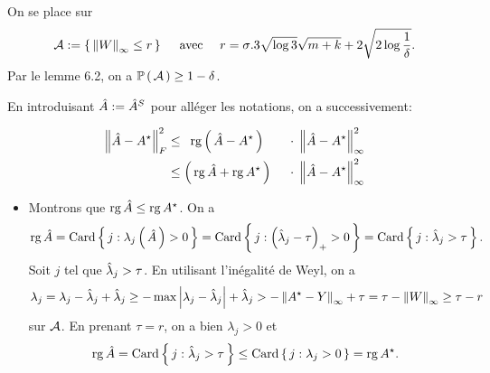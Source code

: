 \setcounter{sol}{1}
\begin{sol}

 On se place sur $$\A := \acc{\norme{W}_{\infty} \leq r} \quad \text{ avec } \quad
  r = \sigma \pt{3 \sqrt{\log 3} \sqrt{m+k} + 2 \sqrt{2
    \log \frac{1}{\delta}}}.$$ Par le lemme 6.2, on a $\displaystyle \mathbb{P} \left( \, \mathcal{A} \, \right)
  \geq 1-\delta$.

 En introduisant $\hat{A} := \hat{A}^S$ pour alléger les notations, on a successivement:

 \begin{alignat}{3}
  \norme{\Aestim - \Aopt}_F^2
   & \leq \enspace \rg \prt{\Aestim - \Aopt}      &\;\cdot
  &\; \norme{\Aestim - \Aopt}_{\infty}^2   \nonumber  \\
   & \leq \prt{\rg \Aestim + \rg \Aopt} \;  &\cdot &\;\norme{\Aestim - \Aopt}_{\infty}^2 \label{eq:rg}
 \end{alignat}
 \begin{itemize}[font= \color{blue} \Large, label= $\bullet$]
  \item Montrons que $\rg \Aestim \leq \rg \Aopt$. On a
        $$\operatorname{rg} \hat{A} = \operatorname{Card} \left \{ \, j : \lambda_j\left( \, \hat{A} \, \right)>0 \, \right \} = \operatorname{Card} \left \{ \, j :
          \left( \hat { \lambda } _ { j } - \tau \right) _ { + }>0 \, \right \} =  \operatorname{Card} \left \{ \, j : \hat{\lambda}_j>\tau \, \right \}.$$
        Soit $j$ tel que $\hat{\lambda}_j>\tau$. En utilisant l'inégalité de Weyl, on a
        $$\lambda_j = \lambda_j - \lestim_j+ \lestim_j \geq - \max \abs{\lambda_j
          - \lestim_j} + \lestim_j>-\norme{\Aopt - Y}_{\infty} + \tau =  \tau
         -\norme{W}_{\infty} \geq \tau - r$$
        sur $\mathcal{A}$. En prenant $\tau = r $, on a bien $\lambda_j>0$ et
        $$\rg \Aestim = \Card \acc{j : \lestim_j>\tau} \leq \Card \acc{j : \lambda_j>0} = \rg \Aopt.$$


\end{itemize}
\end{sol}
